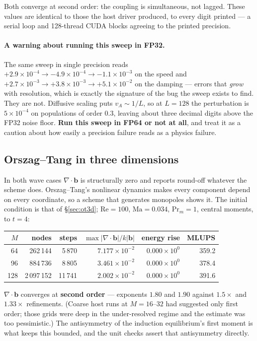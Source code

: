 \documentclass[11pt,a4paper]{article}
\newcommand{\bb}{\bm{b}}
\newcommand{\e}[1]{\times 10^{#1}}
\begin{document}
\noindent Both converge at second order: the coupling is simultaneous, not
lagged. These values are identical to those the host driver produced, to every
digit printed --- a serial loop and 128-thread CUDA blocks agreeing to the
printed precision.

\paragraph{A warning about running this sweep in FP32.} The same sweep in single
precision reads $+2.9\e{-4} \to -4.9\e{-4} \to -1.1\e{-3}$ on the speed and
$+2.7\e{-3} \to +3.8\e{-3} \to +5.1\e{-2}$ on the damping --- errors that
\emph{grow} with resolution, which is exactly the signature of the bug the sweep
exists to find. They are not. Diffusive scaling puts $v_A \sim 1/L$, so at $L=128$
the perturbation is $5\e{-4}$ on populations of order $0.3$, leaving about three
decimal digits above the FP32 noise floor. \textbf{Run this sweep in FP64 or not
at all}, and treat it as a caution about how easily a precision failure reads as
a physics failure.

\subsection{Orszag--Tang in three dimensions}

In both wave cases $\nabla\!\cdot\!\bb$ is structurally zero and reports round-off
whatever the scheme does. Orszag--Tang's nonlinear dynamics makes every component
depend on every coordinate, so a scheme that generates monopoles shows it. The
initial condition is that of \S\ref{sec:ot3d}; $\mathrm{Re}=100$,
$\mathrm{Ma}=0.034$, $\mathrm{Pr}_m=1$, central moments, to $t=4$:

\begin{center}\small
\begin{tabular}{rrrrrr}
\toprule
$M$ & nodes & steps & $\max|\nabla\!\cdot\!\bb| / k|\bb|$ & energy rise & MLUPS \\
\midrule
64  & 262\,144    & 5\,870  & $7.177\e{-2}$ & $0.000\e{0}$ & 359.2 \\
96  & 884\,736    & 8\,805  & $3.461\e{-2}$ & $0.000\e{0}$ & 378.4 \\
128 & 2\,097\,152 & 11\,741 & $2.002\e{-2}$ & $0.000\e{0}$ & 391.6 \\
\bottomrule
\end{tabular}
\end{center}

\noindent $\nabla\!\cdot\!\bb$ converges at \textbf{second order} --- exponents
$1.80$ and $1.90$ against $1.5\times$ and $1.33\times$ refinements. (Coarse host
runs at $M=16$--$32$ had suggested only first order; those grids were deep in the
under-resolved regime and the estimate was too pessimistic.) The antisymmetry of
the induction equilibrium's first moment is what keeps this bounded, and the unit
checks assert that antisymmetry directly.
\end{document}
